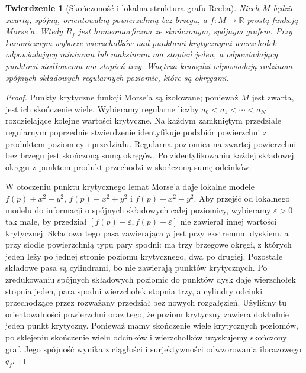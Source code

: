 \documentclass[11pt,a4paper]{report}
\numberwithin{equation}{section}
\theoremstyle{plain}
\newtheorem{twierdzenie}{Twierdzenie}[section]
\theoremstyle{definition}
\theoremstyle{remark}
\begin{document}
\begin{twierdzenie}[Skończoność i lokalna struktura grafu Reeba]
\label{thm:tg-reeb-finite}
Niech $M$ będzie zwartą, spójną, orientowalną
powierzchnią bez brzegu, a $f:M\to\mathbb R$
prostą funkcją Morse'a. Wtedy $R_f$ jest
homeomorficzna ze skończonym, spójnym grafem.
Przy kanonicznym wyborze wierzchołków nad punktami
krytycznymi wierzchołek odpowiadający minimum lub
maksimum ma stopień jeden, a odpowiadający punktowi
siodłowemu ma stopień trzy. Wnętrza krawędzi
odpowiadają rodzinom spójnych składowych regularnych
poziomic, które są okręgami.
\end{twierdzenie}

\begin{proof}
Punkty krytyczne funkcji Morse'a są izolowane;
ponieważ $M$ jest zwarta, jest ich skończenie wiele.
Wybieramy regularne liczby
$a_0<a_1<\cdots<a_N$ rozdzielające kolejne wartości
krytyczne. Na każdym zamkniętym przedziale regularnym
poprzednie stwierdzenie identyfikuje podzbiór powierzchni
z produktem poziomicy i przedziału. Regularna poziomica
na zwartej powierzchni bez brzegu jest skończoną sumą
okręgów. Po zidentyfikowaniu każdej składowej okręgu
z punktem produkt przechodzi w skończoną sumę odcinków.

W otoczeniu punktu krytycznego lemat Morse'a daje lokalne
modele $f(p)+x^2+y^2$, $f(p)-x^2+y^2$ i
$f(p)-x^2-y^2$. Aby przejść od lokalnego modelu do
informacji o spójnych składowych całej poziomicy,
wybieramy $\varepsilon>0$ tak małe, by przedział
$[f(p)-\varepsilon,f(p)+\varepsilon]$ nie zawierał
innej wartości krytycznej. Składowa tego pasa zawierająca
$p$ jest przy ekstremum dyskiem, a przy siodle
powierzchnią typu pary spodni: ma trzy brzegowe okręgi,
z których jeden leży po jednej stronie poziomu
krytycznego, dwa po drugiej. Pozostałe składowe pasa
są cylindrami, bo nie zawierają punktów krytycznych.
Po zredukowaniu spójnych składowych poziomic do punktów
dysk daje wierzchołek stopnia jeden, para spodni
wierzchołek stopnia trzy, a cylindry odcinki
przechodzące przez rozważany przedział bez nowych
rozgałęzień. Użyliśmy tu orientowalności powierzchni
oraz tego, że poziom krytyczny zawiera dokładnie jeden
punkt krytyczny.
Ponieważ mamy skończenie wiele krytycznych poziomów,
po sklejeniu skończenie wielu odcinków i wierzchołków
uzyskujemy skończony graf. Jego spójność wynika z
ciągłości i surjektywności odwzorowania ilorazowego $q_f$.
\end{proof}
\end{document}
